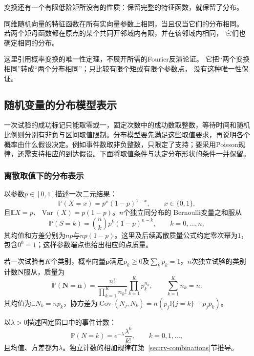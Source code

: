 变换还有一个有限低阶矩所没有的性质：保留完整的特征函数，就保留了分布。
\begin{theorem}[变换函数的分布唯一性]
\label{thm:rv-transform-uniqueness}
同维随机向量的特征函数在所有实向量参数上相同，当且仅当它们的分布相同。
若两个矩母函数都在原点的某个共同开邻域内有限，并在该邻域内相同，
它们也确定相同的分布。
\end{theorem}
这里引用概率变换的唯一性定理，不展开所需的Fourier反演论证。
它把“两个变换相同”转成“两个分布相同”；只比较有限个矩或有限个参数点，
没有这种唯一性保证。

\subsection{随机变量的分布模型表示}
\label{sec:probability-common-distributions}
\label{sec:probability-families-transformations}
一次试验的成功标记只能取零或一，固定次数中的成功数取整数，等待时间和随机比例则分别有非负与区间取值限制。分布模型要先满足这些取值要求，再说明各个概率由什么假设决定。例如事件数取非负整数，只限定了支持；要采用Poisson规律，还需支持相应的到达假设。下面将取值条件与决定分布形状的条件一并保留。

\subsubsection{离散取值下的分布表示}
以参数\(p\in[0,1]\)描述一次二元结果：
\[ \mathbb{P}(X=x)=p^x(1-p)^{1-x},
  \qquad x\in\{0,1\}, \]
且\(\mathbb{E}X=p\)、\(\operatorname{Var}(X)=p(1-p)\)。\(n\)个独立同分布的
Bernoulli变量之和服从
\[ \mathbb{P}(S=k)
  =\binom{n}{k}p^k(1-p)^{n-k},\qquad k=0,\ldots,n, \]
其均值和方差分别为\(np\)与\(np(1-p)\)。这里及后续离散质量公式约定零次幂为\(1\)，包含\(0^0=1\)；这样参数端点也给出相应的点质量。

若一次试验有\(K\)个类别，概率向量\(\bm{p}\)满足\(p_k\geq0\)及\(\sum_kp_k=1\)。\(n\)次独立试验的类别计数\(\bm{N}\)服从，质量为
\[ \mathbb{P}(\bm{N}=\bm{n})
  =\frac{n!}{\prod_{k=1}^{K}n_k!}\prod_{k=1}^{K}p_k^{n_k},\qquad\sum_{k=1}^{K}n_k=n. \]
其均值为\(\mathbb{E}N_k=np_k\)，协方差为\(\operatorname{Cov}(N_j,N_k)=n(p_j\mathbb{I}\{j=k\}-p_jp_k)\)。

以\(\lambda>0\)描述固定窗口中的事件计数：
\[ \mathbb{P}(N=k)
  =e^{-\lambda}\frac{\lambda^k}{k!},\qquad k=0,1,\ldots, \]
且均值、方差都为\(\lambda\)。独立计数的相加规律在第~\ref{sec:rv-combinations}节推导。

